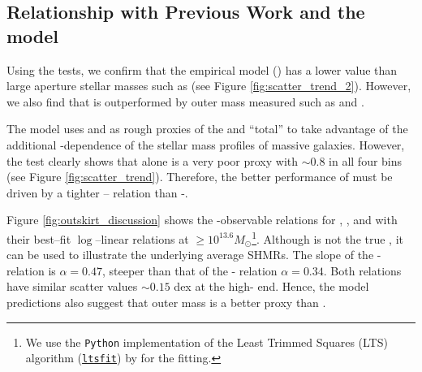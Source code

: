 \documentclass[fleqn,usenatbib,useAMS]{mnras}
\begin{document}

\subsection{Relationship with Previous Work and the \asap{} model}
    \label{sec:asap_discussion}
    
    Using the \topn{} tests, we confirm that the \asap{} empirical model (\citealt{Huang2020}) has a
    lower \sigmvir{} value than large aperture stellar masses such as  (see Figure
    \ref{fig:scatter_trend_2}). 
    However, we also find that \asap{} is outperformed by outer mass measured such as
     and .

    The \asap{} model uses  and  as rough proxies of the \insitu{} and
    ``total'' \mstar{} to take advantage of the additional \mvir{}-dependence of the stellar mass
    profiles of massive galaxies.
    However, the \topn{} test clearly shows that  alone is a very poor \mvir{} proxy with
    \sigmvir{}$\sim 0.8$ in all four bins (see Figure \ref{fig:scatter_trend}).
    Therefore, the better performance of \masap{} must be driven by a tighter 
    \mvir{}-- relation than  \mvir{}-.
    
    Figure \ref{fig:outskirt_discussion} shows the \masap{}-observable relations for ,
    , and  with their best--fit $\log$--linear relations at
    \masap$\geq 10^{13.6} M_{\odot}$\footnote{We use the \texttt{Python} implementation of the Least
    Trimmed Squares (LTS) algorithm (\href{https://pypi.org/project/ltsfit/}{\texttt{ltsfit}}) by
    \citet{Cappellari13b} for the fitting.}.
    Although \masap{} is not the true \mvir{}, it can be used to illustrate the underlying average
    SHMRs.
    The slope of the \masap{}- relation is $\alpha = 0.47$, steeper than that of the
    \masap{}- relation $\alpha = 0.34$.
    Both relations have similar scatter values \sigms$\sim 0.15$ dex at the high-\masap{} end. 
    Hence, the \asap{} model predictions also suggest that outer mass  is a better
    \mvir{} proxy than .
\end{document}
